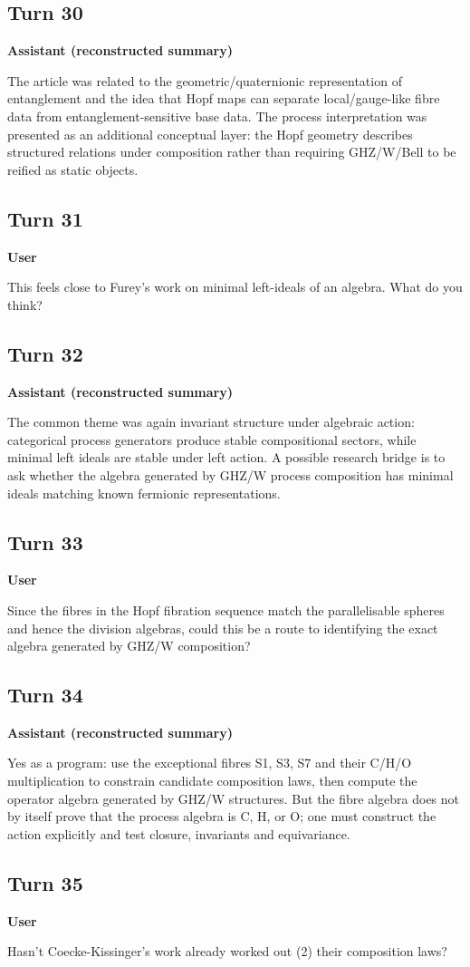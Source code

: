 \documentclass[11pt,a4paper]{article}
\newcommand{\speaker}[1]{\par\medskip\noindent\textbf{\large #1}\par\smallskip}
\begin{document}
\subsection*{Turn 30}
\speaker{Assistant (reconstructed summary)}
The article was related to the geometric/quaternionic representation of entanglement and the idea that Hopf maps can separate local/gauge-like fibre data from entanglement-sensitive base data. The process interpretation was presented as an additional conceptual layer: the Hopf geometry describes structured relations under composition rather than requiring GHZ/W/Bell to be reified as static objects.
\subsection*{Turn 31}
\speaker{User}
This feels close to Furey's work on minimal left-ideals of an algebra. What do you think?
\subsection*{Turn 32}
\speaker{Assistant (reconstructed summary)}
The common theme was again invariant structure under algebraic action: categorical process generators produce stable compositional sectors, while minimal left ideals are stable under left action. A possible research bridge is to ask whether the algebra generated by GHZ/W process composition has minimal ideals matching known fermionic representations.
\subsection*{Turn 33}
\speaker{User}
Since the fibres in the Hopf fibration sequence match the parallelisable spheres and hence the division algebras, could this be a route to identifying the exact algebra generated by GHZ/W composition?
\subsection*{Turn 34}
\speaker{Assistant (reconstructed summary)}
Yes as a program: use the exceptional fibres S1, S3, S7 and their C/H/O multiplication to constrain candidate composition laws, then compute the operator algebra generated by GHZ/W structures. But the fibre algebra does not by itself prove that the process algebra is C, H, or O; one must construct the action explicitly and test closure, invariants and equivariance.
\subsection*{Turn 35}
\speaker{User}
Hasn't Coecke-Kissinger's work already worked out (2) their composition laws?
\end{document}
